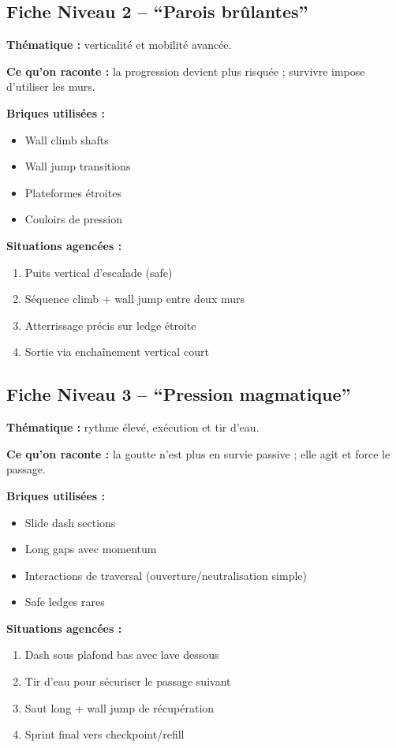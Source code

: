 ﻿\documentclass[12pt,a4paper]{article}
\begin{document}
\subsection{Fiche Niveau 2 -- ``Parois brûlantes''}
\textbf{Thématique :} verticalité et mobilité avancée.

\textbf{Ce qu'on raconte :} la progression devient plus risquée ; survivre impose d'utiliser les murs.

\textbf{Briques utilisées :}
\begin{itemize}[noitemsep]
    \item Wall climb shafts
    \item Wall jump transitions
    \item Plateformes étroites
    \item Couloirs de pression
\end{itemize}

\textbf{Situations agencées :}
\begin{enumerate}[noitemsep]
    \item Puits vertical d'escalade (safe)
    \item Séquence climb + wall jump entre deux murs
    \item Atterrissage précis sur ledge étroite
    \item Sortie via enchaînement vertical court
\end{enumerate}

\subsection{Fiche Niveau 3 -- ``Pression magmatique''}
\textbf{Thématique :} rythme élevé, exécution et tir d'eau.

\textbf{Ce qu'on raconte :} la goutte n'est plus en survie passive ; elle agit et force le passage.

\textbf{Briques utilisées :}
\begin{itemize}[noitemsep]
    \item Slide dash sections
    \item Long gaps avec momentum
    \item Interactions de traversal (ouverture/neutralisation simple)
    \item Safe ledges rares
\end{itemize}

\textbf{Situations agencées :}
\begin{enumerate}[noitemsep]
    \item Dash sous plafond bas avec lave dessous
    \item Tir d'eau pour sécuriser le passage suivant
    \item Saut long + wall jump de récupération
    \item Sprint final vers checkpoint/refill
\end{enumerate}
\end{document}
